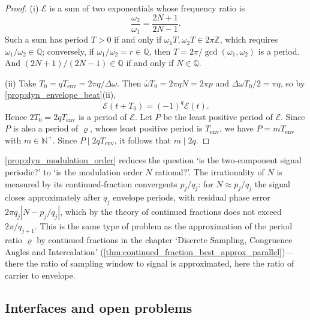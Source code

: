\begin{proof}
(i) $\mathcal E$ is a sum of two exponentials whose frequency ratio is
\[
\frac{\omega_2}{\omega_1}=\frac{2N+1}{2N-1}.
\]
Such a sum has period $T>0$ if and only if $\omega_1T,\omega_2T\in2\pi\mathbb Z$, which requires $\omega_1/\omega_2\in\mathbb Q$; conversely, if $\omega_1/\omega_2=r\in\mathbb Q$, then $T=2\pi/\gcd(\omega_1,\omega_2)$ is a period. And $(2N+1)/(2N-1)\in\mathbb Q$ if and only if $N\in\mathbb Q$.

(ii) Take $T_0=qT_{\text{env}}=2\pi q/\Delta\omega$. Then $\bar\omega T_0=2\pi qN=2\pi p$ and $\Delta\omega T_0/2=\pi q$, so by \cref{prop:dyn_envelope_beat}(ii),
\[
\mathcal E(t+T_0)=(-1)^q\mathcal E(t).
\]
Hence $2T_0=2qT_{\text{env}}$ is a period of $\mathcal E$. Let $P$ be the least positive period of $\mathcal E$. Since $P$ is also a period of $\varrho$, whose least positive period is $T_{\text{env}}$, we have $P=mT_{\text{env}}$ with $m\in\mathbb N^+$. Since $P\mid 2qT_{\text{env}}$, it follows that $m\mid 2q$.
\end{proof}

\begin{remark}\label{rem:dyn_envelope_intercalation}
\cref{prop:dyn_modulation_order} reduces the question `is the two-component signal periodic?' to `is the modulation order $N$ rational?'. The irrationality of $N$ is measured by its continued-fraction convergents $p_j/q_j$: for $N\approx p_j/q_j$ the signal closes approximately after $q_j$ envelope periods, with residual phase error $2\pi q_j|N-p_j/q_j|$, which by the theory of continued fractions does not exceed $2\pi/q_{j+1}$. This is the same type of problem as the approximation of the period ratio $\varrho$ by continued fractions in the chapter `Discrete Sampling, Congruence Angles and Intercalation' (\cref{thm:continued_fraction_best_approx_parallel})---there the ratio of sampling window to signal is approximated, here the ratio of carrier to envelope.
\end{remark}

\subsection{Interfaces and open problems}

